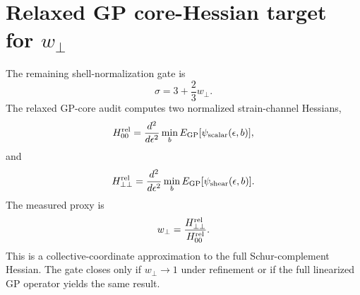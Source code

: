 \section{Relaxed GP core-Hessian target for \(w_\perp\)}
The remaining shell-normalization gate is
\[
  \sigma=3+\frac23w_\perp.
\]
The relaxed GP-core audit computes two normalized strain-channel Hessians,
\[
  H_{00}^{\rm rel}
  =
  \frac{d^2}{d\epsilon^2}
  \min_b E_{\rm GP}[\psi_{\rm scalar}(\epsilon,b)],
\]
and
\[
  H_{\perp\perp}^{\rm rel}
  =
  \frac{d^2}{d\epsilon^2}
  \min_b E_{\rm GP}[\psi_{\rm shear}(\epsilon,b)].
\]
The measured proxy is
\[
  w_\perp=\frac{H_{\perp\perp}^{\rm rel}}{H_{00}^{\rm rel}}.
\]
This is a collective-coordinate approximation to the full Schur-complement
Hessian.  The gate closes only if \(w_\perp\to1\) under refinement or if the
full linearized GP operator yields the same result.
